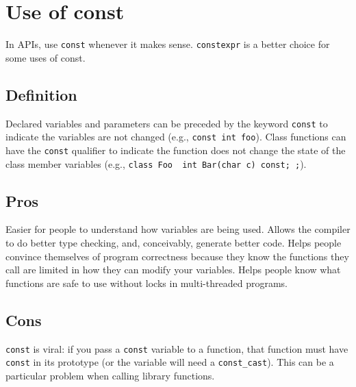 
\section{Use of const}\label{sec:use-of-const}
In APIs, use \texttt{const} whenever it makes sense. \texttt{constexpr} is a better choice for some uses of const.

\subsection{Definition}
Declared variables and parameters can be preceded by the keyword \texttt{const} to indicate the variables are not changed (e.g., \texttt{const int foo}). Class functions can have the \texttt{const} qualifier to indicate the function does not change the state of the class member variables (e.g., \texttt{class Foo { int Bar(char c) const; };}).

\subsection{Pros}
Easier for people to understand how variables are being used. Allows the compiler to do better type checking, and, conceivably, generate better code. Helps people convince themselves of program correctness because they know the functions they call are limited in how they can modify your variables. Helps people know what functions are safe to use without locks in multi-threaded programs.

\subsection{Cons}
\texttt{const} is viral: if you pass a \texttt{const} variable to a function, that function must have \texttt{const} in its prototype (or the variable will need a \texttt{const_cast}). This can be a particular problem when calling library functions.

